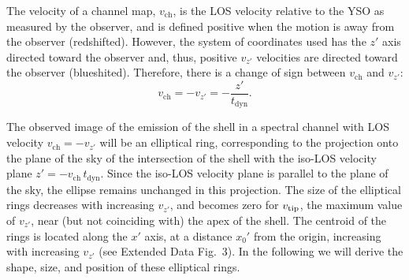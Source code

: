 \documentclass[12pt]{mythesis}
\begin{document}
The velocity of a channel map, $v_\mathrm{ch}$, is the LOS velocity relative to the YSO as measured by the observer, and is defined positive when the motion is away from the observer (redshifted). However, the system of coordinates used has the $z'$ axis directed toward the observer and, thus, positive $v_{z'}$ velocities are directed toward the observer (blueshited). Therefore, there is a change of sign between $v_\mathrm{ch}$ and $v_{z'}$:
\begin{equation}
v_\mathrm{ch}= -v_{z'}= -\frac{z'}{t_\mathrm{dyn}}.
\end{equation}

The observed image of the emission of the shell in a spectral channel with LOS velocity $v_\mathrm{ch}= -v_{z'}$ will be an elliptical ring, corresponding to the projection onto the plane of the sky of the intersection of the shell with the iso-LOS velocity plane $z'= -v_\mathrm{ch}\,t_\mathrm{dyn}$. Since the iso-LOS velocity plane is parallel to the plane of the sky, the ellipse remains unchanged in this projection. 
The size of the elliptical rings decreases with increasing $v_{z'}$, and becomes zero for $v_{\rm tip}$, the maximum value of $v_{z'}$, near (but not coinciding with) the apex of the shell.
The centroid of the rings is located along the $x'$ axis, at a distance $x_0'$ from the origin, increasing with increasing $v_{z'}$ (see Extended Data Fig.~3).
In the following we will derive the shape, size, and position of these elliptical rings.
\end{document}
